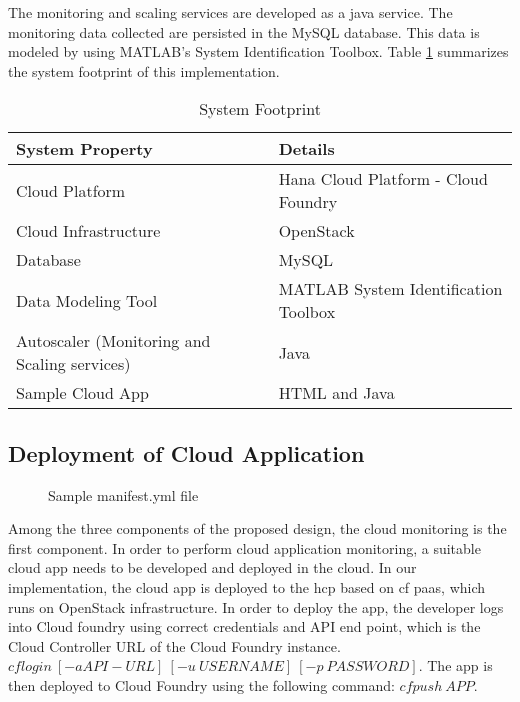 \documentclass[article,type=msc,colorback,12pt,accentcolor=tud8b,table]{tudthesis}
\begin{document}
The monitoring and scaling services are developed as a java service. The monitoring data collected are persisted in the MySQL database. This data is modeled by using MATLAB's System Identification Toolbox. Table \ref{tab:system_footprint} summarizes the system footprint of this implementation.

\begin{table}[H]
	\centering
	\caption{System Footprint}
	\label{tab:system_footprint}
	\begin{tabular}{|l|l|}
		\hline
		\rowcolor[HTML]{EC6500} 
		\textbf{System Property}  & \textbf{Details}                     \\ \hline
		Cloud Platform            & Hana Cloud Platform - Cloud Foundry  \\ \hline
		Cloud Infrastructure      & OpenStack                            \\ \hline
		Database                  & MySQL                                \\ \hline
		Data Modeling Tool        & MATLAB System Identification Toolbox \\ \hline
		Autoscaler (Monitoring and Scaling services) & Java                                 \\ \hline
		Sample Cloud App          & HTML and Java                        \\ \hline
	\end{tabular}
\end{table}

 
	\subsection{Deployment of Cloud Application} 

 \begin{figure}[!h]
 	\begin{center}
 		\makebox[\textwidth]{\texttt{[image: D2]}}
 	\end{center}
 	\caption{Sample manifest.yml file}
 	\label{fig:sample_manifest}
 \end{figure}
	
	Among the three components of the proposed design, the cloud monitoring is the first component. In order to perform cloud application monitoring, a suitable cloud app needs to be developed and deployed in the cloud. In our implementation, the cloud app is deployed to the \gls{hcp} based on \gls{cf} \gls{paas}, which runs on OpenStack \cite{openstack} infrastructure. In order to deploy the app, the developer logs into Cloud foundry using correct credentials and API end point, which is the Cloud Controller URL of the Cloud Foundry instance. $ cf login \: [-a API-URL] \: [-u \: USERNAME] \: [-p \: PASSWORD] $. The app is then deployed to Cloud Foundry using the following command: $ cf push \: APP $.		
\end{document}
